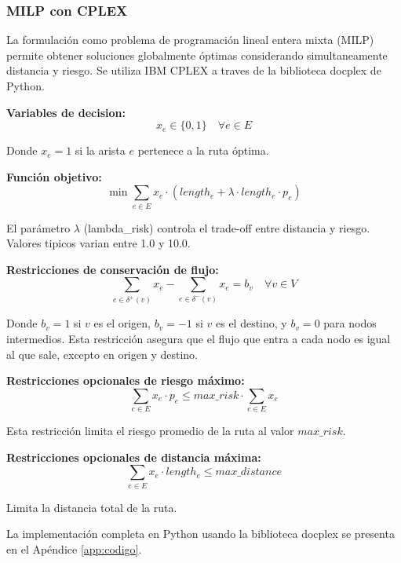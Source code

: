 \documentclass[conference]{IEEEtran}
\begin{document}
\subsubsection{MILP con CPLEX}

La formulación como problema de programación lineal entera mixta (MILP) permite obtener soluciones globalmente óptimas considerando simultaneamente distancia y riesgo. Se utiliza IBM CPLEX a traves de la biblioteca docplex de Python.

\textbf{Variables de decision:}
\begin{equation}
x_e \in \{0, 1\} \quad \forall e \in E
\end{equation}

Donde $x_e = 1$ si la arista $e$ pertenece a la ruta óptima.

\textbf{Función objetivo:}
\begin{equation}
\min \sum_{e \in E} x_e \cdot \left( length_e + \lambda \cdot length_e \cdot p_e \right)
\end{equation}

El parámetro $\lambda$ (lambda\_risk) controla el trade-off entre distancia y riesgo. Valores tipicos varian entre 1.0 y 10.0.

\textbf{Restricciones de conservación de flujo:}
\begin{equation}
\sum_{e \in \delta^+(v)} x_e - \sum_{e \in \delta^-(v)} x_e = b_v \quad \forall v \in V
\end{equation}

Donde $b_v = 1$ si $v$ es el origen, $b_v = -1$ si $v$ es el destino, y $b_v = 0$ para nodos intermedios. Esta restricción asegura que el flujo que entra a cada nodo es igual al que sale, excepto en origen y destino.

\textbf{Restricciones opcionales de riesgo máximo:}
\begin{equation}
\sum_{e \in E} x_e \cdot p_e \leq max\_risk \cdot \sum_{e \in E} x_e
\end{equation}

Esta restricción limita el riesgo promedio de la ruta al valor $max\_risk$.

\textbf{Restricciones opcionales de distancia máxima:}
\begin{equation}
\sum_{e \in E} x_e \cdot length_e \leq max\_distance
\end{equation}

Limita la distancia total de la ruta.

La implementación completa en Python usando la biblioteca docplex se presenta en el Apéndice \ref{app:codigo}.
\end{document}
